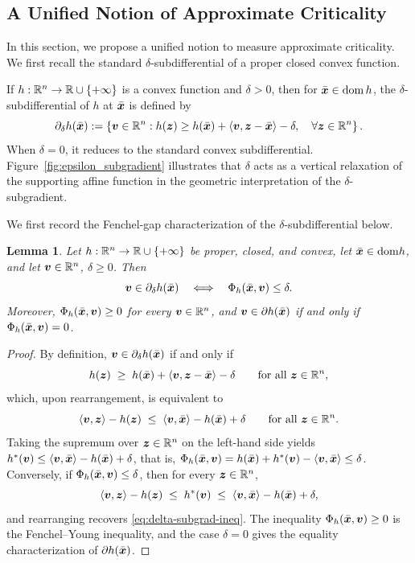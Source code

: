 \documentclass[english]{article}
\newtheorem{lemma}{Lemma}[section]
\begin{document}
\subsection{A Unified Notion of Approximate Criticality}
\label{sec:criticality}
In this section, we propose a unified notion to measure approximate criticality. We first recall the standard \(\delta\)-subdifferential of a proper closed convex function.

If $h:\mathbb{R}^n\to\mathbb{R}\cup\{+\infty\}$ is a convex function and $\delta > 0$, then for $\bar{\bm{x}}\in\operatorname{dom} h$, the $\delta$-subdifferential of $h$ at $\bar{\bm{x}}$ is defined by
\[
    \partial_\delta h(\bar{\bm{x}})
    :=
    \left\{
    \bm{v}\in\mathbb{R}^n:
    h(\bm{z})\ge h(\bar{\bm{x}})
    +\langle \bm{v},\bm{z}-\bar{\bm{x}}\rangle-\delta,
    \quad \forall \bm{z}\in\mathbb{R}^n
    \right\}.
\] 
When $\delta=0$, it reduces to the standard convex subdifferential. 
Figure~\ref{fig:epsilon_subgradient} illustrates that $\delta$ acts as a vertical relaxation of the supporting affine function in the geometric interpretation of the $\delta$-subgradient.

We first record the Fenchel-gap characterization of the
$\delta$-subdifferential below.
\begin{lemma}
\label{lem:fenchel-gap-toolkit}
Let $h:\mathbb{R}^n\to\mathbb{R}\cup\{+\infty\}$ be proper, closed, and convex, let
$\bar{\bm{x}}\in\mathrm{dom} h$, and let $\bm{v}\in\mathbb{R}^n$, $\delta\ge0$. Then
\[
    \bm{v}\in\partial_\delta h(\bar{\bm{x}})
    \quad\Longleftrightarrow\quad
    \Phi_h(\bar{\bm{x}},\bm{v})\le\delta .
\]
Moreover, $\Phi_h(\bar{\bm{x}},\bm{v})\ge0$ for every $\bm{v}\in\mathbb{R}^n$, and
$\bm{v}\in\partial h(\bar{\bm{x}})$ if and only if $\Phi_h(\bar{\bm{x}},\bm{v})=0$.
\end{lemma}

\begin{proof}
By definition, $\bm{v}\in\partial_\delta h(\bar{\bm{x}})$ if and only if
\begin{equation}
    h(\bm{z})\;\ge\;h(\bar{\bm{x}})+\langle\bm{v},\bm{z}-\bar{\bm{x}}\rangle-\delta
    \qquad\text{for all }\bm{z}\in\mathbb{R}^n,
    \label{eq:delta-subgrad-ineq}
\end{equation}
which, upon rearrangement, is equivalent to
\[
    \langle\bm{v},\bm{z}\rangle-h(\bm{z})
    \;\le\;
    \langle\bm{v},\bar{\bm{x}}\rangle-h(\bar{\bm{x}})+\delta
    \qquad\text{for all }\bm{z}\in\mathbb{R}^n.
\]
Taking the supremum over $\bm{z}\in\mathbb{R}^n$ on the left-hand side yields
$h^*(\bm{v})\le\langle\bm{v},\bar{\bm{x}}\rangle-h(\bar{\bm{x}})+\delta$, that is,
$\Phi_h(\bar{\bm{x}},\bm{v})=h(\bar{\bm{x}})+h^*(\bm{v})-\langle\bm{v},\bar{\bm{x}}\rangle
\le\delta$. Conversely, if $\Phi_h(\bar{\bm{x}},\bm{v})\le\delta$, then for every
$\bm{z}\in\mathbb{R}^n$,
\[
    \langle\bm{v},\bm{z}\rangle-h(\bm{z})
    \;\le\;
    h^*(\bm{v})
    \;\le\;
    \langle\bm{v},\bar{\bm{x}}\rangle-h(\bar{\bm{x}})+\delta,
\]
and rearranging recovers \eqref{eq:delta-subgrad-ineq}. The inequality
$\Phi_h(\bar{\bm{x}},\bm{v})\ge0$ is the Fenchel--Young inequality, and the case
$\delta=0$ gives the equality characterization of $\partial h(\bar{\bm{x}})$.
\end{proof}
\end{document}
